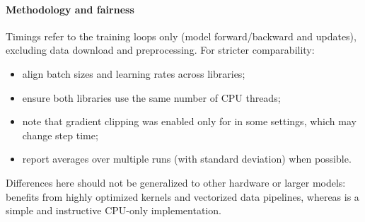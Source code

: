 \paragraph{Methodology and fairness}
Timings refer to the training loops only (model forward/backward and updates), excluding data download and preprocessing. For stricter comparability:
\begin{itemize}
    \item align batch sizes and learning rates across libraries;
    \item ensure both libraries use the same number of CPU threads;
    \item note that gradient clipping was enabled only for \mfnet in some settings, which may change step time;
    \item report averages over multiple runs (with standard deviation) when possible.
\end{itemize}

Differences here should not be generalized to other hardware or larger models: \pytorch benefits from highly optimized kernels and vectorized data pipelines, whereas \mfnet is a simple and instructive CPU-only implementation.
